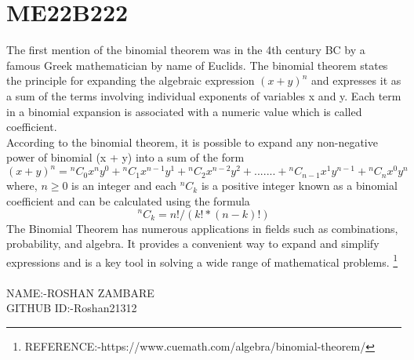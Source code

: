 \section{ME22B222}
The first mention of the binomial theorem was in the 4th century BC by a famous Greek mathematician by name of Euclids. The binomial theorem states the principle for expanding the algebraic expression $(x + y)^n$ and expresses it as a sum of the terms involving individual exponents of variables x and y. Each term in a binomial expansion is associated with a numeric value which is called coefficient.
\\
According to the binomial theorem, it is possible to expand any non-negative power of binomial (x + y) into a sum of the form
\begin{equation}
    (x+y)^n={}^{n}C_{0}x^ny^0+{}^{n}C_{1}x^{n-1}y^1+{}^{n}C_{2}x^{n-2}y^2+.......+{}^{n}C_{n-1}x^{1}y^{n-1}+{}^{n}C_{n}x^0y^n
\end{equation}
where, $ n\ge 0 $  is an integer and each ${}^{n}C_{k}$ is a positive integer known as a binomial coefficient and can be calculated using the formula
\begin{equation}
     {}^{n}C_{k}= n!/(k! * (n-k)!)
\end{equation}
The Binomial Theorem has numerous applications in fields such as combinations, probability, and algebra. It provides a convenient way to expand and simplify expressions and is a key tool in solving a wide range of mathematical problems.
\footnote{REFERENCE:-https://www.cuemath.com/algebra/binomial-theorem/}
\\
\\
NAME:-ROSHAN ZAMBARE  \\
GITHUB ID:-Roshan21312
